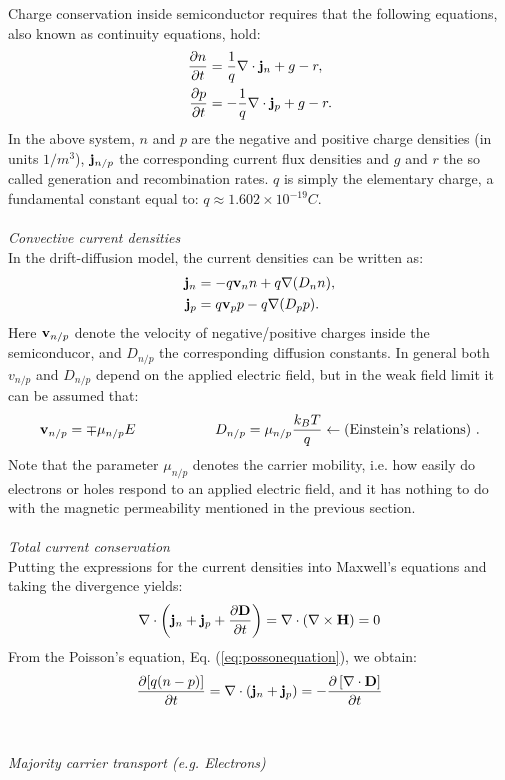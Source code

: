 \documentclass[11pt,a4paper]{report}
\def\Nabla{\ensuremath\bm{\nabla}}
\def\bm{\ensuremath\mathbf}
\def\curl{\ensuremath\Nabla\times}
\def\div{\ensuremath\Nabla\cdot}
\begin{document}
Charge conservation inside semiconductor requires that the following equations, also known as continuity equations, hold:
\begin{align}
  \frac{\partial n}{\partial t} &= \frac{1}{q} \div \bm{j}_n +g-r \label{eq:continuity_n_charge} ,\\
  \frac{\partial p}{\partial t} &= -\frac{1}{q} \div \bm{j}_p +g-r \label{eq:continuity_p_charge} .
\end{align}
In the above system, $n$ and $p$ are the negative and positive charge densities (in units $1/m^3$), $\bm{j}_{n/p}$ the corresponding current flux densities and $g$ and $r$ the so called generation and recombination rates. $q$ is simply 
the elementary charge, a fundamental constant equal to: $q \approx  1.602\times 10^{-19}C$. \\\\
\emph{Convective current densities}\\

In the drift-diffusion model, the current densities can be written as:
\begin{align*}
  \bm{j}_n &= -q \bm{v}_n n + q\Nabla (D_n n), \\
  \bm{j}_p &=  q \bm{v}_p p - q\Nabla (D_p p).
\end{align*}
Here $\bm{v}_{n/p}$ denote the velocity of negative/positive charges inside the semiconducor, and $D_{n/p}$ the corresponding diffusion constants. In general both $v_{n/p}$ and $D_{n/p}$ depend on the applied electric field, but in the 
weak field limit it can be assumed that: 
\begin{align*}
  \bm{v}_{n/p} = \mp \mu_{n/p} E \hspace{2cm} D_{n/p}=\mu_{n/p} \frac{k_BT}{q}  \leftarrow \text{(Einstein's relations) }. 
\end{align*}
Note that the parameter $\mu_{n/p}$ denotes the carrier mobility, i.e. how easily do electrons or holes respond to an applied electric field, and it has nothing to do with the magnetic permeability mentioned in the previous section.\\\\
\emph{Total current conservation}\\

Putting the expressions for the current densities into Maxwell's equations and taking the divergence yields:
\begin{equation*}
  \div \left ( \bm{j}_n + \bm{j}_p +\frac{\partial \bm{D}}{\partial t} \right ) = \div (\curl \bm{H}) = 0
\end{equation*}
From the Poisson's equation, Eq. (\ref{eq:possonequation}), we obtain:
\begin{equation*}
  \frac{\partial [q(n-p)]}{\partial t} = \div \left (\bm{j}_n+\bm{j}_p \right ) = -\frac{\partial \left [\div \bm{D} \right ]}{\partial t} 
\end{equation*}
\\\\
\emph{Majority carrier transport (e.g. Electrons)} \\
\end{document}
